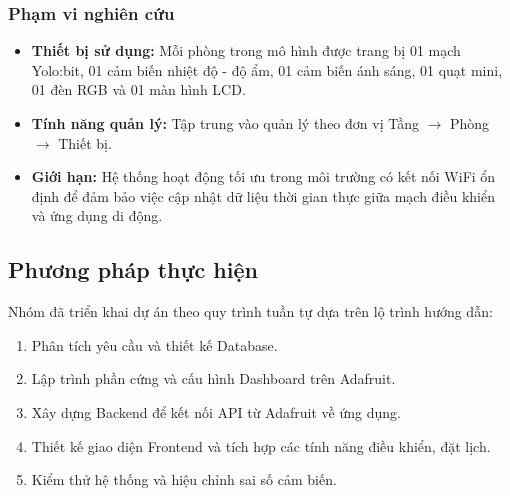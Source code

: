 \subsubsection{Phạm vi nghiên cứu}
\begin{itemize}
    \item \textbf{Thiết bị sử dụng:} Mỗi phòng trong mô hình được trang bị 01 mạch Yolo:bit, 01 cảm biến nhiệt độ - độ ẩm, 01 cảm biến ánh sáng, 01 quạt mini, 01 đèn RGB và 01 màn hình LCD.
    \item \textbf{Tính năng quản lý:} Tập trung vào quản lý theo đơn vị Tầng $\rightarrow$ Phòng $\rightarrow$ Thiết bị.
    \item \textbf{Giới hạn:} Hệ thống hoạt động tối ưu trong môi trường có kết nối WiFi ổn định để đảm bảo việc cập nhật dữ liệu thời gian thực giữa mạch điều khiển và ứng dụng di động.
\end{itemize}

\subsection{Phương pháp thực hiện}
Nhóm đã triển khai dự án theo quy trình tuần tự dựa trên lộ trình hướng dẫn:
\begin{enumerate}
    \item Phân tích yêu cầu và thiết kế Database.
    \item Lập trình phần cứng và cấu hình Dashboard trên Adafruit.
    \item Xây dựng Backend để kết nối API từ Adafruit về ứng dụng.
    \item Thiết kế giao diện Frontend và tích hợp các tính năng điều khiển, đặt lịch.
    \item Kiểm thử hệ thống và hiệu chỉnh sai số cảm biến.
\end{enumerate}